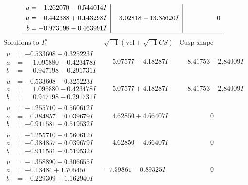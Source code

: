 \documentclass[1p]{elsarticle_modified}
\theoremstyle{definition}
\newcommand{\I}{\sqrt{-1}}
\begin{document}
$$\begin{array}{c|c|c}
\begin{aligned}
u &= -1.262070 - 0.544014 I \\
a &= -0.442388 + 0.143298 I \\
b &= -0.973198 - 0.463991 I\end{aligned}
 & \phantom{-}3.02818 - 13.35620 I & \phantom{-0.000000 } 0\\
 \hline 
 \end{array}$$\newpage$$\begin{array}{c|c|c}  
\text{Solutions to }I^u_{1}& \I (\text{vol} + \sqrt{-1}CS) & \text{Cusp shape}\\
 \hline 
\begin{aligned}
u &= -0.533608 + 0.325223 I \\
a &= \phantom{-}1.095880 + 0.423478 I \\
b &= \phantom{-}0.947198 - 0.291731 I\end{aligned}
 & \phantom{-}5.07577 - 4.18287 I & \phantom{-}8.41753 + 2.84009 I \\ \hline\begin{aligned}
u &= -0.533608 - 0.325223 I \\
a &= \phantom{-}1.095880 - 0.423478 I \\
b &= \phantom{-}0.947198 + 0.291731 I\end{aligned}
 & \phantom{-}5.07577 + 4.18287 I & \phantom{-}8.41753 - 2.84009 I \\ \hline\begin{aligned}
u &= -1.255710 + 0.560612 I \\
a &= -0.384857 - 0.039679 I \\
b &= -0.911581 + 0.519532 I\end{aligned}
 & \phantom{-}4.62850 + 4.66407 I & \phantom{-0.000000 } 0 \\ \hline\begin{aligned}
u &= -1.255710 - 0.560612 I \\
a &= -0.384857 + 0.039679 I \\
b &= -0.911581 - 0.519532 I\end{aligned}
 & \phantom{-}4.62850 - 4.66407 I & \phantom{-0.000000 } 0 \\ \hline\begin{aligned}
u &= -1.358890 + 0.306655 I \\
a &= -0.13484 + 1.70545 I \\
b &= -0.229309 + 1.162940 I\end{aligned}
 & -7.59861 - 0.89325 I & \phantom{-0.000000 } 0 \\ \hline\begin{aligned}

\end{aligned}
\end{array}$$
\end{document}
